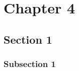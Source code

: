 
\chapter{Chapter 4}\label{chapters:chapter_4}
\vspace{-7mm}

\section{Section 1}\label{sec:ch_4_sec_1}

\subsection{Subsection 1}\label{subsec:subsec_4.1.1}


\clearpage

